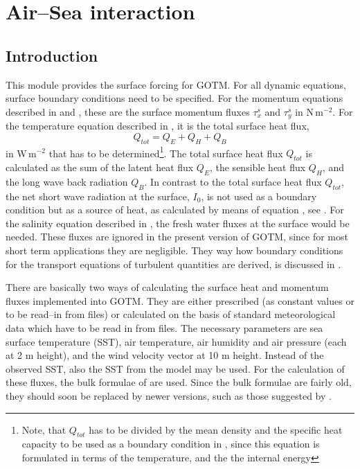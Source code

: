 %
%

\section{Air--Sea interaction \label{sec:airseaIntro}}

\subsection{Introduction}

This module provides the surface forcing for GOTM. For all dynamic
equations, surface boundary conditions need to be specified.  For the
momentum equations described in  and
, these are the surface momentum fluxes $\tau_x^s$ and
$\tau_y^s$ in N\,m$^{-2}$. For the temperature
equation described in , it is the total surface heat flux,
\begin{equation}
  Q_{tot}=Q_E+Q_H+Q_B
\end{equation}
in W\,m$^{-2}$ that has to be determined\footnote{Note, that $Q_{tot}$
has to be divided by the mean density and the specific heat capacity
to be used as a boundary condition in , since this equation is
formulated in terms of the temperature, and the the internal
energy}. The total surface heat flux $Q_{tot}$ is calculated as the
sum of the latent heat flux $Q_E$, the sensible heat flux $Q_H$, and
the long wave back radiation $Q_B$.  In contrast to the total surface
heat flux $Q_{tot}$, the net short wave radiation at the surface,
$I_0$, is not used as a boundary condition but as a source of heat, as
calculated by means of equation , see \cite{PaulsonSimpson77}.
For the salinity equation described in , the fresh
water fluxes at the surface would be needed. These fluxes are ignored
in the present version of GOTM, since for most short term applications
they are negligible. They way how boundary conditions for the
transport equations of turbulent quantities are derived, is discussed
in .

There are basically two ways of calculating the surface heat and
momentum fluxes implemented into GOTM. They are either prescribed (as
constant values or to be read--in from files) or calculated on the
basis of standard meteorological data which have to be read in from
files. The necessary parameters are sea surface temperature (SST), air
temperature, air humidity and air pressure (each at 2 m height), and
the wind velocity vector at 10 m height. Instead of the observed SST,
also the SST from the model may be used.  For the calculation of these
fluxes, the bulk formulae of \cite{Kondo75} are used. Since the
\cite{Kondo75} bulk formulae are fairly old, they should soon be
replaced by newer versions, such as those suggested by
\cite{Fairalletal96}.
